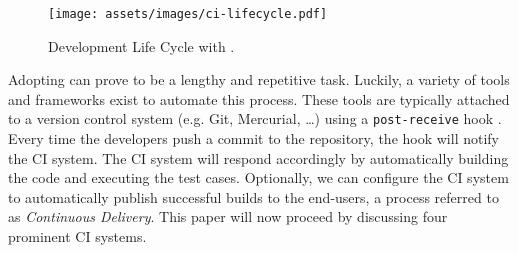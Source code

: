 \begin{figure}[htbp!]
	\centering
	\texttt{[image: assets/images/ci-lifecycle.pdf]}
	\caption{Development Life Cycle with \CI{}.}
	\label{fig:agile-ci-lifecycle}
\end{figure}

\noindent Adopting \CI{} can prove to be a lengthy and repetitive task. Luckily, a variety of tools and frameworks exist to automate this process. These tools are typically attached to a version control system (e.g. Git, Mercurial, \dots) using a \texttt{post-receive} hook \cite{SmartJenkinsDefinitive}. Every time the developers push a commit to the repository, the hook will notify the CI system. The CI system will respond accordingly by automatically building the code and executing the test cases. Optionally, we can configure the CI system to automatically publish successful builds to the end-users, a process referred to as \emph{Continuous Delivery}. This paper will now proceed by discussing four prominent CI systems.





